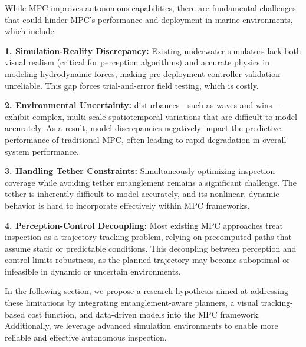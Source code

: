 
While \ac{MPC} improves autonomous capabilities, there are fundamental challenges that could hinder \ac{MPC}'s performance and deployment in marine environments, which include:

\textbf{1. Simulation-Reality Discrepancy:} Existing underwater simulators lack both visual realism (critical for perception algorithms) and accurate physics in modeling hydrodynamic forces, making pre-deployment controller validation unreliable. This gap forces trial-and-error field testing, which is costly.

\textbf{2. Environmental Uncertainty:} disturbances—such as waves and wins—exhibit complex, multi-scale spatiotemporal variations that are difficult to model accurately. As a result, model discrepancies negatively impact the predictive performance of traditional MPC, often leading to rapid degradation in overall system performance.

\textbf{3. Handling Tether Constraints:} Simultaneously optimizing inspection coverage while avoiding tether entanglement remains a significant challenge. The tether is inherently difficult to model accurately, and its nonlinear, dynamic behavior is hard to incorporate effectively within MPC frameworks. 

\textbf{4. Perception-Control Decoupling:} Most existing MPC approaches treat inspection as a trajectory tracking problem, relying on precomputed paths that assume static or predictable conditions. This decoupling between perception and control limits robustness, as the planned trajectory may become suboptimal or infeasible in dynamic or uncertain environments. 




In the following section, we propose a research hypothesis aimed at addressing these limitations by integrating entanglement-aware planners, a visual tracking-based cost function, and data-driven models into the \ac{MPC} framework. Additionally, we leverage advanced simulation environments to enable more reliable and effective autonomous inspection.
